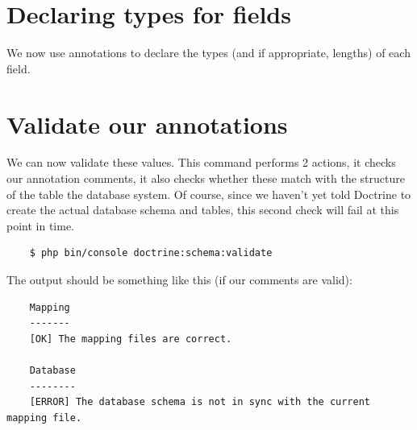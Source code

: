 \documentclass[a4paperpaper,openright]{book}
\newenvironment{Shaded}{}{}
\newcommand{\AnnotationTok}[1]{\textcolor[rgb]{0.38,0.63,0.69}{\textbf{\textit{#1}}}}
\newcommand{\CommentTok}[1]{\textcolor[rgb]{0.38,0.63,0.69}{\textit{#1}}}
\newcommand{\KeywordTok}[1]{\textcolor[rgb]{0.00,0.44,0.13}{\textbf{#1}}}
\newcommand{\OtherTok}[1]{\textcolor[rgb]{0.00,0.44,0.13}{#1}}
\begin{document}
\hypertarget{declaring-types-for-fields}{%
\section{Declaring types for fields}\label{declaring-types-for-fields}}

We now use annotations to declare the types (and if appropriate,
lengths) of each field.

\begin{Shaded}
\end{Shaded}

\hypertarget{validate-our-annotations}{%
\section{Validate our annotations}\label{validate-our-annotations}}

We can now validate these values. This command performs 2 actions, it
checks our annotation comments, it also checks whether these match with
the structure of the table the database system. Of course, since we
haven't yet told Doctrine to create the actual database schema and
tables, this second check will fail at this point in time.

\begin{verbatim}
    $ php bin/console doctrine:schema:validate
\end{verbatim}

The output should be something like this (if our comments are valid):

\begin{verbatim}
    Mapping
    -------
    [OK] The mapping files are correct.

    Database
    --------
    [ERROR] The database schema is not in sync with the current mapping file.
\end{verbatim}
\end{document}

